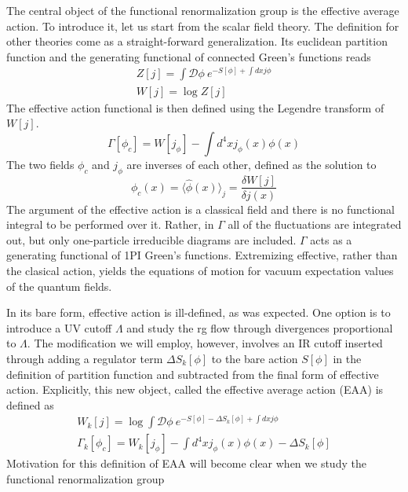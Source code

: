 \documentclass[11pt, a4paper]{article}
\begin{document}
The central object of the functional renormalization group is the effective average action.
To introduce it, let us start from the scalar field theory. The definition for other theories come as a straight-forward generalization.
Its euclidean partition function and the generating functional of connected Green's functions reads
\begin{gather}
    Z[j] = \int \mathcal{D}\phi \ e^{-S[\phi] + \int dx j \phi} \\
    W[j] = \log{Z[j]}
\end{gather}
The effective action functional is then defined using the Legendre transform of $W[j]$.
\begin{equation}
    \Gamma[\phi_c] = W[j_\phi] - \int d^4 x j_\phi(x) \phi(x)
\end{equation}
The two fields $\phi_c$ and $j_\phi$ are inverses of each other, defined as the solution to
\begin{equation}
    \phi_c(x) = \langle \hat\phi (x) \rangle_j = \frac{\delta W[j]}{\delta j(x)}
\end{equation}
The argument of the effective action is a classical field and there is no functional integral to be performed over it.
Rather, in $\Gamma$ all of the fluctuations are integrated out, but only one-particle irreducible diagrams
are included. $\Gamma$ acts as a generating functional of 1PI Green's functions. Extremizing effective, rather than
the clasical action, yields the equations of motion for vacuum expectation values of the quantum fields.

In its bare form, effective action is ill-defined, as was expected. One option is to introduce a UV cutoff $\Lambda$
and study the rg flow through divergences proportional to $\Lambda$. The modification we will employ, however, involves
an IR cutoff inserted through adding a regulator term $\Delta S_k[\phi]$ to the bare action $S[\phi]$ in the definition of partition function
and subtracted from the final form of effective action. Explicitly, this new object, called the effective average action (EAA) is defined as
\begin{gather}
    W_k[j] = \log{\int \mathcal{D}\phi \ e^{-S[\phi] - \Delta S_k[\phi] + \int dx j \phi}}\\
    \Gamma_k[\phi_c] = W_k[j_\phi] - \int d^4 x j_\phi(x) \phi(x) - \Delta S_k[\phi]
\end{gather}
Motivation for this definition of EAA will become clear when we study the functional renormalization group
\end{document}
